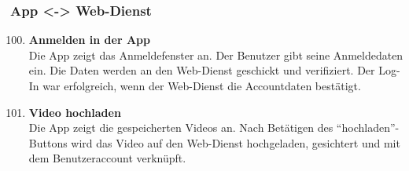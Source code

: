 \subsubsection{\gls{App} <-> \gls{Web-Dienst}}
\begin{enumerate}[\bfseries{T}10]  
\setcounter{enumi}{99}{}

\item \textbf{Anmelden in der \gls{App}} \hfill\\
Die \gls{App} zeigt das Anmeldefenster an. Der Benutzer gibt seine Anmeldedaten ein. Die Daten werden an den \gls{Web-Dienst} geschickt und verifiziert. Der Log-In war erfolgreich, wenn der \gls{Web-Dienst} die Accountdaten best\"atigt.

\item \textbf{Video hochladen} \hfill\\
Die \gls{App} zeigt die gespeicherten Videos an. Nach Bet\"atigen des ``hochladen''-Buttons wird das Video auf den \gls{Web-Dienst} hochgeladen, gesichtert und mit dem Benutzeraccount verkn\"upft.
\end{enumerate}

